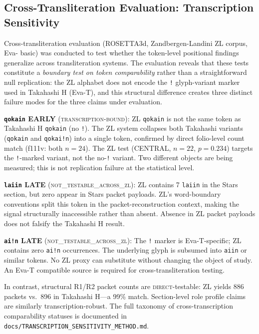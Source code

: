 \documentclass[11pt,a4paper,twocolumn]{article}
\begin{document}
\subsection{Cross-Transliteration Evaluation: Transcription Sensitivity}
\label{sec:transcription_sensitivity}

Cross-transliteration evaluation (ROSETTA3d, Zandbergen-Landini ZL corpus, Eva- basic) was conducted to test whether the token-level positional findings generalize across transliteration systems. The evaluation reveals that these tests constitute a \textit{boundary test on token comparability} rather than a straightforward null replication: the ZL alphabet does not encode the \texttt{!} glyph-variant marker used in Takahashi H (Eva-T), and this structural difference creates three distinct failure modes for the three claims under evaluation.

\textbf{\texttt{qokain} EARLY} (\textsc{transcription-bound}): ZL \texttt{qokain} is not the same token as Takahashi H \texttt{qokain} (no \texttt{!}). The ZL system collapses both Takahashi variants (\texttt{qokain} and \texttt{qokai!n}) into a single token, confirmed by direct folio-level count match (f111v: both $n=24$). The ZL test (CENTRAL, $n=22$, $p=0.234$) targets the \texttt{!}-marked variant, not the no-\texttt{!} variant. Two different objects are being measured; this is not replication failure at the statistical level.

\textbf{\texttt{laiin} LATE} (\textsc{not\_testable\_across\_zl}): ZL contains 7 \texttt{laiin} in the Stars section, but zero appear in Stars packet payloads. ZL's word-boundary conventions split this token in the packet-reconstruction context, making the signal structurally inaccessible rather than absent. Absence in ZL packet payloads does not falsify the Takahashi H result.

\textbf{\texttt{ai!n} LATE} (\textsc{not\_testable\_across\_zl}): The \texttt{!} marker is Eva-T-specific; ZL contains zero \texttt{ai!n} occurrences. The underlying glyph is subsumed into \texttt{aiin} or similar tokens. No ZL proxy can substitute without changing the object of study. An Eva-T compatible source is required for cross-transliteration testing.

In contrast, structural R1/R2 packet counts are \textsc{direct}-testable: ZL yields 886 packets vs.\ 896 in Takahashi H---a 99\% match. Section-level role profile claims are similarly transcription-robust. The full taxonomy of cross-transcription comparability statuses is documented in \texttt{docs/TRANSCRIPTION\_SENSITIVITY\_METHOD.md}.
\end{document}
